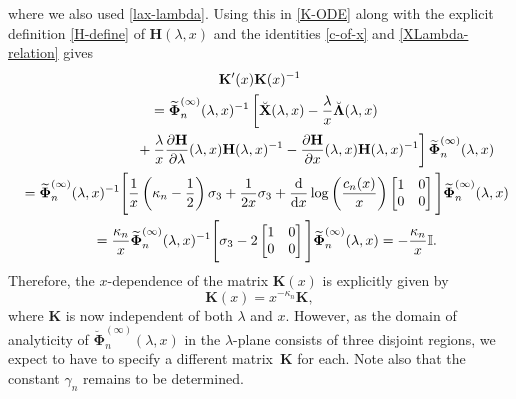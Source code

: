 \documentclass[11pt]{article}
\numberwithin{equation}{section}
\numberwithin{equation}{section}
\newcommand{\dd}{\mathrm{d}}
\newcommand{\para}[1]{\breve{#1}}
\begin{document}
where we also used \eqref{lax-lambda}.
Using this in \eqref{K-ODE} along with the explicit definition \eqref{H-define} of $\mathbf{H}(\lambda,x)$ and the identities \eqref{c-of-x} and \eqref{XLambda-relation} gives
\begin{gather*}
 \mathbf{K}'(x)\mathbf{K}(x)^{-1}\\
\quad =\widetilde{\boldsymbol{\Phi}}_n^{(\infty)}(\lambda,x)^{-1}\left[\breve{\mathbf{X}}(\lambda,x)-\frac{\lambda}{x}\breve{\boldsymbol{\Lambda}}(\lambda,x)
\right.\\
\left.
\hphantom{\quad =\widetilde{\boldsymbol{\Phi}}_n^{(\infty)}(\lambda,x)^{-1}}{}
+\frac{\lambda}{x}\frac{\partial\mathbf{H}}{\partial\lambda}(\lambda,x)\mathbf{H}(\lambda,x)^{-1}-\frac{\partial\mathbf{H}}{\partial x}(\lambda,x)\mathbf{H}(\lambda,x)^{-1}\right]\widetilde{\boldsymbol{\Phi}}_n^{(\infty)}(\lambda,x)\\
 \quad =\widetilde{\boldsymbol\Phi}_n^{(\infty)}(\lambda,x)^{-1}\Bigg[\frac{1}{x}\left(\kappa_n-\frac{1}{2}\right)\sigma_3 +\frac{1}{2x}\sigma_3+\frac{\dd}{\dd x}\log\left(\frac{c_n(x)}{x}\right)\begin{bmatrix}1&0\\0&0\end{bmatrix}\Bigg]\widetilde{\boldsymbol{\Phi}}_n^{(\infty)}(\lambda,x)\\
 \quad=\frac{\kappa_n}{x}\widetilde{\boldsymbol{\Phi}}_n^{(\infty)}(\lambda,x)^{-1}\Bigg[\sigma_3-2
 \begin{bmatrix}1&0\\0&0\end{bmatrix}\Bigg]\widetilde{\boldsymbol{\Phi}}_n^{(\infty)}(\lambda,x)
=-\frac{\kappa_n}{x}\mathbb{I}.
\end{gather*}
Therefore, the $x$-dependence of the matrix $\mathbf{K}(x)$ is explicitly given by
\begin{equation*}
 \mathbf{K}(x)=x^{-\kappa_n}\mathbf{K},
\end{equation*}
where $\mathbf{K}$ is now independent of both $\lambda$ and $x$. However, as the domain of analyticity of $\para{\mathbf{\Phi}}_n^{(\infty)}(\lambda,x)$ in the $\lambda$-plane consists of three disjoint regions, we expect to have to specify a different matrix~$\mathbf{K}$ for each. Note also that the constant $\gamma_n$ remains to be determined.
\end{document}
